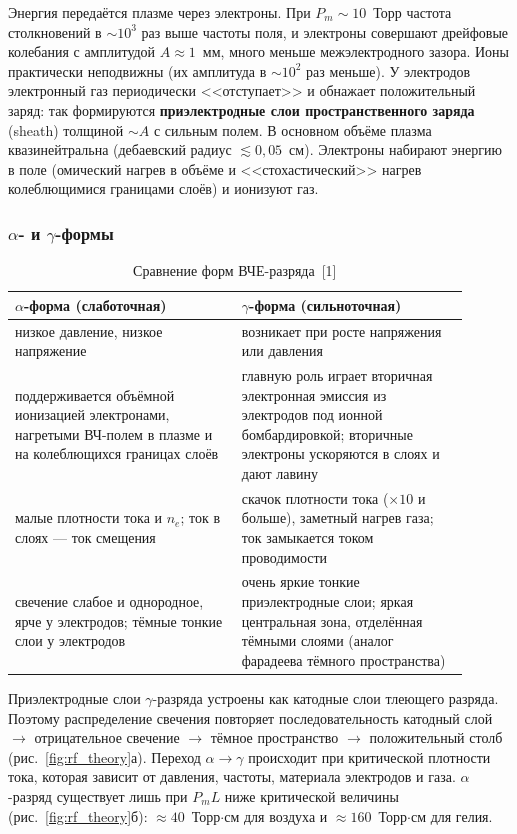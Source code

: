 \documentclass[12pt,a4paper]{article}
\begin{document}
Энергия передаётся плазме через электроны. При $P_m \sim 10$~Торр частота
столкновений в $\sim 10^3$ раз выше частоты поля, и электроны совершают
дрейфовые колебания с амплитудой $A \approx 1$~мм, много меньше
межэлектродного зазора. Ионы практически неподвижны (их амплитуда
в $\sim 10^2$ раз меньше). У электродов электронный газ периодически
<<отступает>> и обнажает положительный заряд: так формируются
\textbf{приэлектродные слои пространственного заряда} (sheath) толщиной
$\sim A$ с сильным полем. В основном объёме плазма квазинейтральна
(дебаевский радиус $\lesssim 0{,}05$~см). Электроны набирают энергию в
поле (омический нагрев в объёме и <<стохастический>> нагрев колеблющимися
границами слоёв) и ионизуют газ.

\subsubsection{$\alpha$- и $\gamma$-формы}\label{sec:rfforms}

\begin{table}[H]
  \centering
  \caption{Сравнение форм ВЧЕ-разряда~[1]}
  \begin{tabular}{p{0.45\linewidth}p{0.45\linewidth}}
    \toprule
    $\alpha$-форма (слаботочная) & $\gamma$-форма (сильноточная) \\
    \midrule
    низкое давление, низкое напряжение &
    возникает при росте напряжения или давления \\
    поддерживается объёмной ионизацией электронами, нагретыми ВЧ-полем
    в плазме и на колеблющихся границах слоёв &
    главную роль играет вторичная электронная эмиссия из электродов под
    ионной бомбардировкой; вторичные электроны ускоряются в слоях и
    дают лавину \\
    малые плотности тока и $n_e$; ток в слоях --- ток смещения &
    скачок плотности тока ($\times 10$ и больше), заметный нагрев газа;
    ток замыкается током проводимости \\
    свечение слабое и однородное, ярче у электродов; тёмные тонкие слои
    у электродов &
    очень яркие тонкие приэлектродные слои; яркая центральная зона,
    отделённая тёмными слоями (аналог фарадеева тёмного пространства) \\
    \bottomrule
  \end{tabular}
\end{table}

Приэлектродные слои $\gamma$-разряда устроены как катодные слои
тлеющего разряда. Поэтому распределение свечения повторяет
последовательность катодный слой $\to$ отрицательное свечение
$\to$ тёмное пространство $\to$ положительный столб (рис.~\ref{fig:rf_theory}а).
Переход $\alpha \to \gamma$ происходит при критической плотности тока,
которая зависит от давления, частоты, материала электродов и газа.
$\alpha$-разряд существует лишь при $P_m L$ ниже критической величины
(рис.~\ref{fig:rf_theory}б): $\approx 40$~Торр$\cdot$см для воздуха и
$\approx 160$~Торр$\cdot$см для гелия.
\end{document}
